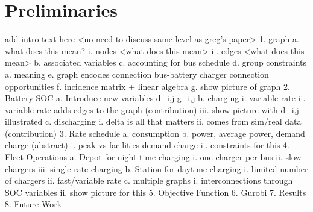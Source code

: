 \section{Preliminaries}
add intro text here
<no need to discuss same level as greg's paper>
1. graph
    a. what does this mean?
    	i. nodes <what does this mean>
    	ii. edges <what does this mean>
    b. associated variables
    c. accounting for bus schedule
    d. group constraints
        a. meaning
    e. graph encodes connection bus-battery charger connection opportunities
    f. incidence matrix + linear algebra
    g. show picture of graph
2. Battery SOC
    a. Introduce new variables d_{i,j} g_{i,j}
    b. charging
        i. variable rate
	ii. variable rate adds edges to the graph (contribution)
	iii. show picture with d_{i,j} illustrated
    c. discharging
        i. delta is all that matters
	ii. comes from sim/real data (contribution)
3. Rate schedule
    a. consumption
    b. power, average power, demand charge (abstract)
        i. peak vs facilities demand charge
	ii. constraints for this
4. Fleet Operations
    a. Depot for night time charging
        i. one charger per bus
	ii. slow chargers
	iii. single rate charging
    b. Station for daytime charging
        i. limited number of chargers
	ii. fast/variable rate
    c. multiple graphs
        i. interconnections through SOC variables
	ii. show picture for this
5. Objective Function
6. Gurobi
7. Results
8. Future Work






